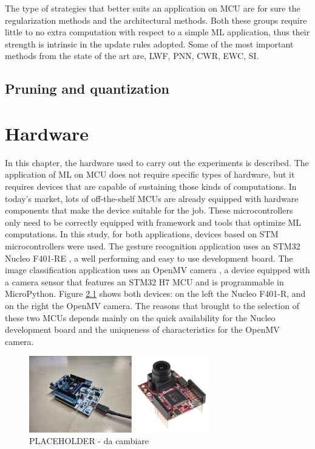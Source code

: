 \documentclass[12pt]{report}
\begin{document}
The type of strategies that better suits an application on MCU are for sure the regularization methods and the architectural methods. Both these groups require little to no extra computation with respect to a simple ML application, thus their strength is intrinsic in the update rules adopted. Some of the most important methods from the state of the art are, LWF, PNN, CWR, EWC, SI. 



\section{Pruning and quantization}





\chapter{Hardware} 
\label{hardware}
In this chapter, the hardware used to carry out the experiments is described. The application of ML on MCU does not require specific types of hardware, but it requires devices that are capable of sustaining those kinds of computations. In today's market, lots of off-the-shelf MCUs are already equipped with hardware components that make the device suitable for the job. These microcontrollers only need to be correctly equipped with framework and tools that optimize ML computations. In this study, for both applications, devices based on STM microcontrollers were used. The gesture recognition application uses an STM32 Nucleo F401-RE \autocite{nucleo_datasheet}, a well performing and easy to use development board. The image classification application uses an OpenMV camera \autocite{openmv_datasheet}, a device equipped with a camera sensor that features an STM32 H7 MCU and is programmable in MicroPython. Figure \ref{fig:hardware_all} shows both devices: on the left the Nucleo F401-R, and on the right the OpenMV camera. The reasons that brought to the selection of these two MCUs depends mainly on the quick availability for the Nucleo development board and the uniqueness of characteristics for the OpenMV camera.

\begin{figure}[h!]
    \centering
    \includegraphics[width=0.7\textwidth]{Figures/Chapter2/hardware.jpg} 
    \caption{PLACEHOLDER - da cambiare}
    \label{fig:hardware_all}    
\end{figure}
\end{document}
